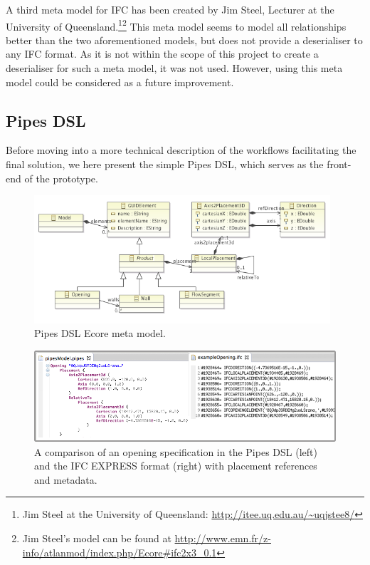 A third meta model for IFC has been created by Jim Steel, Lecturer at the University of Queensland.\footnote{Jim Steel at the University of Queensland: \url{http://itee.uq.edu.au/~uqjstee8/}}\footnote{Jim Steel's model can be found at \url{http://www.emn.fr/z-info/atlanmod/index.php/Ecore#ifc2x3_0.1}} This meta model seems to model all relationships better than the two aforementioned models, but does not provide a deserialiser to any IFC format. As it is not within the scope of this project to create a deserialiser for such a meta model, it was not used. However, using this meta model could be considered as a future improvement.

\subsection{Pipes DSL}
\label{subsec:pipes_dsl}
Before moving into a more technical description of the workflows facilitating the final solution, we here present the simple Pipes DSL, which serves as the front-end of the prototype.

\begin{figure}[t]
    \centering
        \includegraphics[width=110mm]{images/PipesEcoreModel.png}
    \caption{Pipes DSL Ecore meta model.}
    \label{fig:pipes_dsl_ecore_model}
\end{figure}

\begin{figure}[t]
    \centering
        \includegraphics[width=120mm]{images/pipesAndExpressExample.png}
    \caption{A comparison of an opening specification in the Pipes DSL (left) and the IFC EXPRESS format (right) with placement references and metadata.}
    \label{fig:pipes_express_comparison}
\end{figure}

